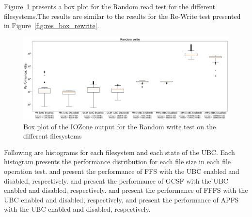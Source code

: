 \FloatBarrier

Figure~\ref{fig:res_box_rndwrite} presents a box plot for the Random read test for the different filesystems.The results are similar to the results for the \mbox{Re-Write} test presented in Figure~\ref{fig:res_box_rewrite}.

\begin{figure}
	\label{fig:res_box_rndwrite}
	\begin{center}
		\includegraphics[width=1.0\textwidth]{figures.nosync/benchmarking/Random write-boxplot.pdf}
	\end{center}
	\caption[Box plot of the IOZone output for the Random write test]{Box plot of the IOZone output for the Random write test on the different filesystems}
\end{figure}

\FloatBarrier
\clearpage

Following are histograms for each filesystem and each state of the \gls{UBC}. Each histogram presents the performance distribution for each file size in each file operation test.  and  present the performance of \gls{FFS} with the \gls{UBC} enabled and disabled, respectively.  and  present the performance of \gls{GCSF} with the \gls{UBC} enabled and disabled, respectively.  and  present the performance of \gls{FFFS} with the \gls{UBC} enabled and disabled, respectively.  and  present the performance of \gls{APFS} with the \gls{UBC} enabled and disabled, respectively.
\clearpage

